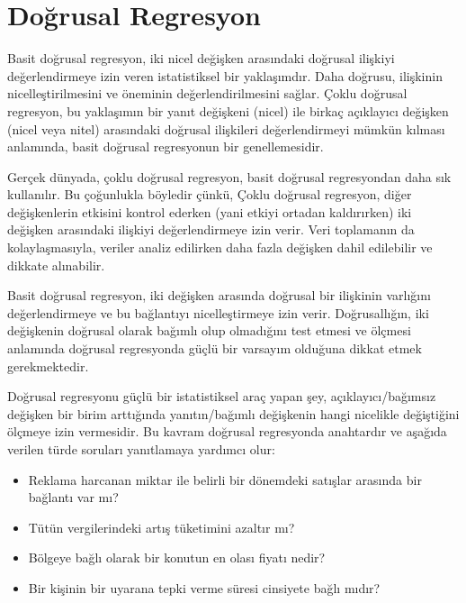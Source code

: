 \documentclass[
  letterpaper,
  DIV=11,
  numbers=noendperiod]{scrreprt}
\begin{document}
\chapter*{Doğrusal Regresyon}\label{doux11frusal-regresyon}


Basit doğrusal regresyon, iki nicel değişken arasındaki doğrusal
ilişkiyi değerlendirmeye izin veren istatistiksel bir yaklaşımdır. Daha
doğrusu, ilişkinin nicelleştirilmesini ve öneminin değerlendirilmesini
sağlar. Çoklu doğrusal regresyon, bu yaklaşımın bir yanıt değişkeni
(nicel) ile birkaç açıklayıcı değişken (nicel veya nitel) arasındaki
doğrusal ilişkileri değerlendirmeyi mümkün kılması anlamında, basit
doğrusal regresyonun bir genellemesidir.

Gerçek dünyada, çoklu doğrusal regresyon, basit doğrusal regresyondan
daha sık kullanılır. Bu çoğunlukla böyledir çünkü, Çoklu doğrusal
regresyon, diğer değişkenlerin etkisini kontrol ederken (yani etkiyi
ortadan kaldırırken) iki değişken arasındaki ilişkiyi değerlendirmeye
izin verir. Veri toplamanın da kolaylaşmasıyla, veriler analiz edilirken
daha fazla değişken dahil edilebilir ve dikkate alınabilir.

Basit doğrusal regresyon, iki değişken arasında doğrusal bir ilişkinin
varlığını değerlendirmeye ve bu bağlantıyı nicelleştirmeye izin verir.
Doğrusallığın, iki değişkenin doğrusal olarak bağımlı olup olmadığını
test etmesi ve ölçmesi anlamında doğrusal regresyonda güçlü bir varsayım
olduğuna dikkat etmek gerekmektedir.

Doğrusal regresyonu güçlü bir istatistiksel araç yapan şey,
açıklayıcı/bağımsız değişken bir birim arttığında yanıtın/bağımlı
değişkenin hangi nicelikle değiştiğini ölçmeye izin vermesidir. Bu
kavram doğrusal regresyonda anahtardır ve aşağıda verilen türde soruları
yanıtlamaya yardımcı olur:

\begin{itemize}
\item
  Reklama harcanan miktar ile belirli bir dönemdeki satışlar arasında
  bir bağlantı var mı?
\item
  Tütün vergilerindeki artış tüketimini azaltır mı?
\item
  Bölgeye bağlı olarak bir konutun en olası fiyatı nedir?
\item
  Bir kişinin bir uyarana tepki verme süresi cinsiyete bağlı mıdır?
\end{itemize}
\end{document}
